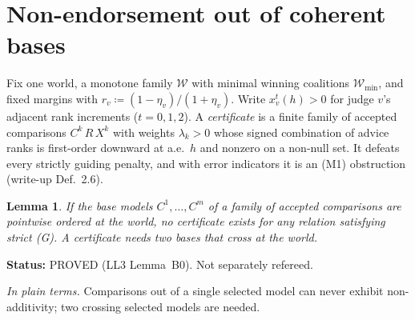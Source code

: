 \documentclass[11pt]{article}
\newtheorem{lemma}[theorem]{Lemma}
\theoremstyle{definition}
\theoremstyle{remark}
\newcommand{\W}{\mathcal W}
\newcommand{\src}[1]{\textsf{#1}}
\newcommand{\status}[1]{\par\smallskip\noindent\textbf{Status:} #1\par}
\newcommand{\inwords}[1]{\noindent\textit{In plain terms.} #1\par\smallskip}
\begin{document}
\section{Non-endorsement out of coherent bases}\label{sec:certificate}

Fix one world, a monotone family $\W$ with minimal winning coalitions $\W_{\min}$, and fixed margins with $r_v\coloneqq(1-\eta_v)/(1+\eta_v)$. Write $x^t_v(h)>0$ for judge $v$'s adjacent rank increments ($t=0,1,2$). A \emph{certificate} is a finite family of accepted comparisons $C^k\,R\,X^k$ with weights $\lambda_k>0$ whose signed combination of advice ranks is first-order downward at a.e.\ $h$ and nonzero on a non-null set. It defeats every strictly guiding penalty, and with error indicators it is an (M1) obstruction (write-up Def.~2.6).

\begin{lemma}\label{lem:B0}
If the base models $C^1,\dots,C^m$ of a family of accepted comparisons are pointwise ordered at the world, no certificate exists for any relation satisfying strict (G). A certificate needs two bases that \emph{cross} at the world.
\end{lemma}
\status{PROVED (\src{LL3} Lemma~B0). Not separately refereed.}
\inwords{Comparisons out of a single selected model can never exhibit non-additivity; two crossing selected models are needed.}
\end{document}
